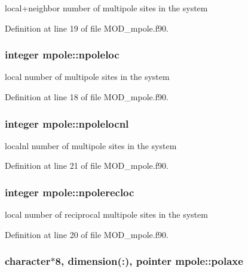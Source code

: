 local+neighbor number of multipole sites in the system 



Definition at line 19 of file M\-O\-D\-\_\-mpole.\-f90.

\hypertarget{classmpole_a72e8bbbeb09748396f126b5c0feceda2}{
\subsubsection[{npoleloc}]{\setlength{\rightskip}{0pt plus 5cm}integer mpole\-::npoleloc}}\label{classmpole_a72e8bbbeb09748396f126b5c0feceda2}


local number of multipole sites in the system 



Definition at line 18 of file M\-O\-D\-\_\-mpole.\-f90.

\hypertarget{classmpole_a155cba3d52800902729811ecd85d6980}{
\subsubsection[{npolelocnl}]{\setlength{\rightskip}{0pt plus 5cm}integer mpole\-::npolelocnl}}\label{classmpole_a155cba3d52800902729811ecd85d6980}


localnl number of multipole sites in the system 



Definition at line 21 of file M\-O\-D\-\_\-mpole.\-f90.

\hypertarget{classmpole_a3cf245cf7c3576d5360159dbe1d09c44}{
\subsubsection[{npolerecloc}]{\setlength{\rightskip}{0pt plus 5cm}integer mpole\-::npolerecloc}}\label{classmpole_a3cf245cf7c3576d5360159dbe1d09c44}


local number of reciprocal multipole sites in the system 



Definition at line 20 of file M\-O\-D\-\_\-mpole.\-f90.

\hypertarget{classmpole_ad235afbac90e53a4a5d504375546f3d8}{
\subsubsection[{polaxe}]{\setlength{\rightskip}{0pt plus 5cm}character$\ast$8, dimension(\-:), pointer mpole\-::polaxe}}\label{classmpole_ad235afbac90e53a4a5d504375546f3d8}


